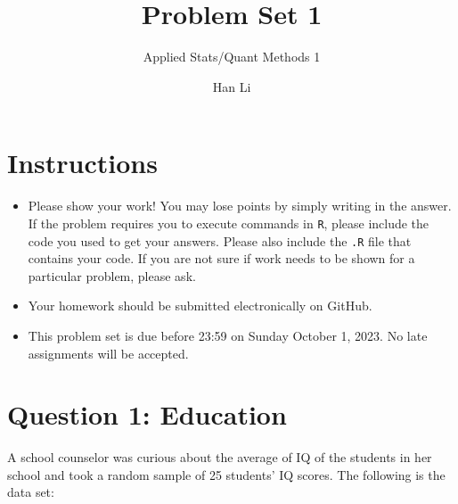 \documentclass[12pt,letterpaper]{article}
\title{Problem Set 1}
\date{Han Li}
\author{Applied Stats/Quant Methods 1}
\begin{document}
	\maketitle
	
	\section*{Instructions}
	\begin{itemize}
	\item Please show your work! You may lose points by simply writing in the answer. If the problem requires you to execute commands in \texttt{R}, please include the code you used to get your answers. Please also include the \texttt{.R} file that contains your code. If you are not sure if work needs to be shown for a particular problem, please ask.
\item Your homework should be submitted electronically on GitHub.
\item This problem set is due before 23:59 on Sunday October 1, 2023. No late assignments will be accepted.
	\end{itemize}
	
	\vspace{1cm}
	\section*{Question 1: Education}

A school counselor was curious about the average of IQ of the students in her school and took a random sample of 25 students' IQ scores. The following is the data set:\\
\vspace{.5cm}

  

\vspace{1cm}
\end{document}

